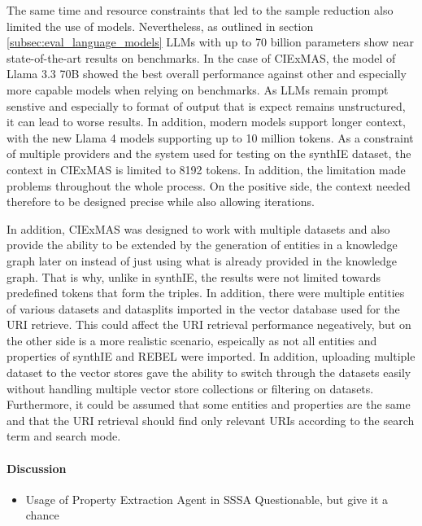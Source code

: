 \documentclass[a4paper,oneside,bibliography=totoc]{scrbook}
\begin{document}
The same time and resource constraints that led to the sample reduction also limited the use of models. Nevertheless, as outlined in section \ref{subsec:eval_language_models} \acp{LLM} with up to 70 billion parameters show near state-of-the-art results on benchmarks. In the case of CIExMAS, the model of Llama 3.3 70B showed the best overall performance against other and especially more capable models when relying on benchmarks. As \acp{LLM} remain prompt senstive and especially to format of output that is expect remains unstructured, it can lead to worse results. In addition, modern models support longer context, with the new Llama 4 models supporting up to 10 million tokens. As a constraint of multiple providers and the system used for testing on the synthIE dataset, the context in CIExMAS is limited to 8192 tokens. In addition, the limitation made problems throughout the whole process. On the positive side, the context needed therefore to be designed precise while also allowing iterations.

In addition, CIExMAS was designed to work with multiple datasets and also provide the ability to be extended by the generation of entities in a knowledge graph later on instead of just using what is already provided in the knowledge graph. That is why, unlike in synthIE, the results were not limited towards predefined tokens that form the triples. In addition, there were multiple entities of various datasets and datasplits imported in the vector database used for the URI retrieve. This could affect the URI retrieval performance negeatively, but on the other side is a more realistic scenario, espeically as not all entities and properties of synthIE and REBEL were imported. In addition, uploading multiple dataset to the vector stores gave the ability to switch through the datasets easily without handling multiple vector store collections or filtering on datasets. Furthermore, it could be assumed that some entities and properties are the same and that the URI retrieval should find only relevant URIs according to the search term and search mode.

\paragraph{Discussion}
\begin{itemize}
  \item Usage of Property Extraction Agent in SSSA Questionable, but give it a chance
\end{itemize}
\end{document}
